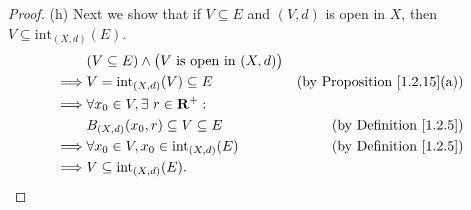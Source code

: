 \begin{proof}{(h)}
    Next we show that if \(V \subseteq E\) and \((V, d)\) is open in \(X\), then \(V \subseteq \text{int}_{(X, d)}(E)\).
    \begin{align*}
                 & (V \subseteq E) \land \big(V \text{ is open in } (X, d)\big)                                           \\
        \implies & V = \text{int}_{(X, d)}(V) \subseteq E                       & \text{(by Proposition \ref{1.2.15}(a))} \\
        \implies & \forall x_0 \in V, \exists\ r \in \mathbf{R}^+ :                                                               \\
                 & B_{(X, d)}(x_0, r) \subseteq V \subseteq E                   & \text{(by Definition \ref{1.2.5})}      \\
        \implies & \forall x_0 \in V, x_0 \in \text{int}_{(X, d)}(E)            & \text{(by Definition \ref{1.2.5})}      \\
        \implies & V \subseteq \text{int}_{(X, d)}(E).
    \end{align*}


\end{proof}
